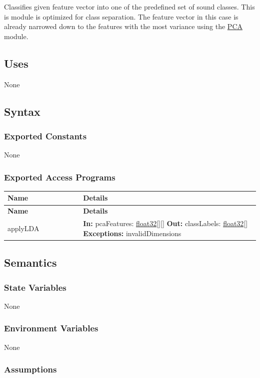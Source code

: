 \documentclass[12pt, titlepage]{article}
\newenvironment{apitable}{%
\begin{center}
\begin{longtable}{|p{0.3\linewidth}|p{0.7\linewidth}|} 
\hline
\textbf{Name} & \textbf{Details} \\
\hline
\endfirsthead
\hline
\textbf{Name} & \textbf{Details} \\
\hline
\endhead
\hline
\endfoot
\hline
\endlastfoot
}{%
\end{longtable}
\end{center}
}
\newcommand{\apifunc}[4]{%
#1 & 
\textbf{In:} #2 \newline
\textbf{Out:} #3 \newline
\textbf{Exceptions:} #4 \\
\hline
}
\begin{document}
Classifies given feature vector into one of the predefined set of sound classes.
This is module is optimized for class separation. The feature vector in this
case is already narrowed down to the features with the most variance using the
\hyperref[MG-mPCA]{PCA} module. 

\subsection{Uses}

None

\subsection{Syntax}

\subsubsection{Exported Constants}

None

\subsubsection{Exported Access Programs}
\begin{apitable}
  \apifunc{applyLDA}
    {pcaFeatures: \hyperref[generic:float32]{float32}[][]}
    {classLabels: \hyperref[generic:float32]{float32}[]}
    {invalidDimensions}
\end{apitable}

\subsection{Semantics}

\subsubsection{State Variables}

None

\subsubsection{Environment Variables}

None

\subsubsection{Assumptions}
\end{document}
